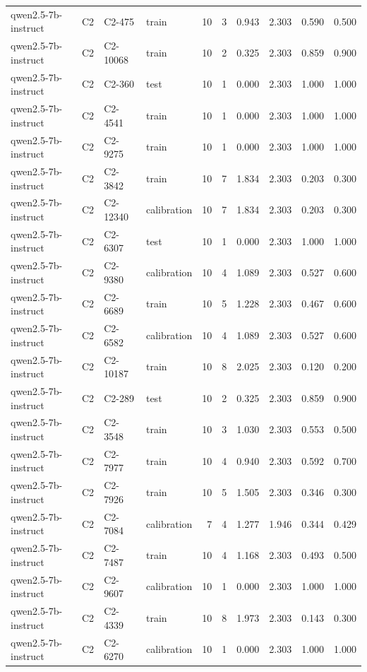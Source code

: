\begin{table}
\begin{tabular}{llllrrrrrr}
qwen2.5-7b-instruct & C2 & C2-475 & train & 10 & 3 & 0.943 & 2.303 & 0.590 & 0.500 \\
qwen2.5-7b-instruct & C2 & C2-10068 & train & 10 & 2 & 0.325 & 2.303 & 0.859 & 0.900 \\
qwen2.5-7b-instruct & C2 & C2-360 & test & 10 & 1 & 0.000 & 2.303 & 1.000 & 1.000 \\
qwen2.5-7b-instruct & C2 & C2-4541 & train & 10 & 1 & 0.000 & 2.303 & 1.000 & 1.000 \\
qwen2.5-7b-instruct & C2 & C2-9275 & train & 10 & 1 & 0.000 & 2.303 & 1.000 & 1.000 \\
qwen2.5-7b-instruct & C2 & C2-3842 & train & 10 & 7 & 1.834 & 2.303 & 0.203 & 0.300 \\
qwen2.5-7b-instruct & C2 & C2-12340 & calibration & 10 & 7 & 1.834 & 2.303 & 0.203 & 0.300 \\
qwen2.5-7b-instruct & C2 & C2-6307 & test & 10 & 1 & 0.000 & 2.303 & 1.000 & 1.000 \\
qwen2.5-7b-instruct & C2 & C2-9380 & calibration & 10 & 4 & 1.089 & 2.303 & 0.527 & 0.600 \\
qwen2.5-7b-instruct & C2 & C2-6689 & train & 10 & 5 & 1.228 & 2.303 & 0.467 & 0.600 \\
qwen2.5-7b-instruct & C2 & C2-6582 & calibration & 10 & 4 & 1.089 & 2.303 & 0.527 & 0.600 \\
qwen2.5-7b-instruct & C2 & C2-10187 & train & 10 & 8 & 2.025 & 2.303 & 0.120 & 0.200 \\
qwen2.5-7b-instruct & C2 & C2-289 & test & 10 & 2 & 0.325 & 2.303 & 0.859 & 0.900 \\
qwen2.5-7b-instruct & C2 & C2-3548 & train & 10 & 3 & 1.030 & 2.303 & 0.553 & 0.500 \\
qwen2.5-7b-instruct & C2 & C2-7977 & train & 10 & 4 & 0.940 & 2.303 & 0.592 & 0.700 \\
qwen2.5-7b-instruct & C2 & C2-7926 & train & 10 & 5 & 1.505 & 2.303 & 0.346 & 0.300 \\
qwen2.5-7b-instruct & C2 & C2-7084 & calibration & 7 & 4 & 1.277 & 1.946 & 0.344 & 0.429 \\
qwen2.5-7b-instruct & C2 & C2-7487 & train & 10 & 4 & 1.168 & 2.303 & 0.493 & 0.500 \\
qwen2.5-7b-instruct & C2 & C2-9607 & calibration & 10 & 1 & 0.000 & 2.303 & 1.000 & 1.000 \\
qwen2.5-7b-instruct & C2 & C2-4339 & train & 10 & 8 & 1.973 & 2.303 & 0.143 & 0.300 \\
qwen2.5-7b-instruct & C2 & C2-6270 & calibration & 10 & 1 & 0.000 & 2.303 & 1.000 & 1.000 \\

\end{tabular}
\end{table}
